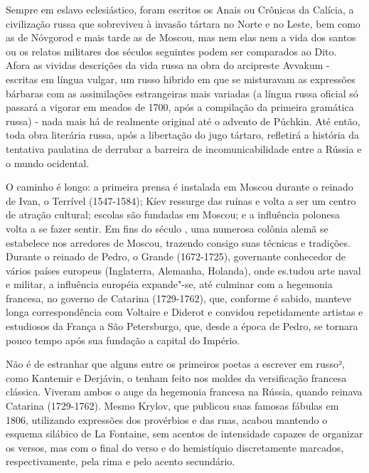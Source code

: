 Sempre em eslavo eclesiástico, foram escritos os Anais ou Crônicas da
Calícia, a civilização russa que sobreviveu à invasão tártara no Norte e
no Leste, bem como as de Nóvgorod e mais tarde as de Moscou, mas nem
elas nem a vida dos santos ou os relatos militares dos séculos seguintes
podem ser comparados ao Dito. Afora as vividas descrições da vida russa
na obra do arcipreste Avvakum - escritas em língua vulgar, um russo
hibrido em que se misturavam as expres­sões bárbaras com as assimilações
estrangeiras mais variadas (a língua russa oficial só passará a vigorar
em meados de 1700, após a compilação da primeira gramática russa) - nada
mais há de realmente original até o advento de Púchkin. Até então, toda
obra literária russa, após a libertação do jugo tártaro, refletirá a
história da tentativa paulatina de derrubar a barreira de
incomunicabilidade entre a Rússia e o mundo ocidental.

O caminho é longo: a primeira prensa é instalada em Moscou durante o
rei­nado de Ivan, o Terrível (1547-1584); Kíev ressurge das ruínas e
volta a ser um centro de atração cultural; escolas são fundadas em
Moscou; e a influência po­lonesa volta a se fazer sentir. Em fins do
século , uma numerosa colônia alemã se estabelece nos arredores de
Moscou, trazendo consigo suas técnicas e tradições. Durante o reinado de
Pedro, o Grande (1672-1725), governante co­nhecedor de vários países
europeus (Inglaterra, Alemanha, Holanda), onde es­.tudou arte naval e
militar, a influência européia expande"-se, até culminar com a hegemonia
francesa, no governo de Catarina  (1729-1762), que, conforme é sabido,
manteve longa correspondência com Voltaire e Diderot e convidou
re­petidamente artistas e estudiosos da França a São Petersburgo, que,
desde a épo­ca de Pedro, se tornara pouco tempo após sua fundação a
capital do Império.

Não é de estranhar que alguns entre os primeiros poetas a escrever em
rus­so², como Kantemir e Derjávin, o tenham feito nos moldes da
versificação fran­cesa clássica. Viveram ambos o auge da hegemonia
francesa na Rússia, quando reinava Catarina  (1729-1762). Mesmo
Krylov, que publicou suas famosas fábulas em 1806, utilizando expressões
dos provérbios e das ruas, acabou man­tendo o esquema silábico de La
Fontaine, sem acentos de intensidade capazes de organizar os versos, mas
com o final do verso e do hemistíquio discreta­mente marcados,
respectivamente, pela rima e pelo acento secundário.

